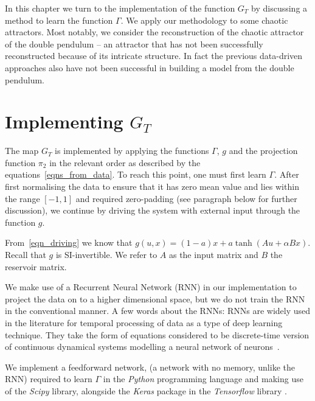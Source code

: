 In this chapter we turn to the implementation of the function $G_T$ by discussing a method to learn the function $\Gamma$. We apply our methodology to some chaotic attractors. Most notably, we consider the reconstruction of the chaotic attractor of the double pendulum -- an  attractor that has not been successfully reconstructed because of its intricate structure. In fact the previous data-driven approaches also have not been successful in building a model from the double pendulum. 




\section{Implementing $G_T$}
The map $G_T$ is implemented by applying the functions $\Gamma$, $g$ and the projection function $\pi_2$ in the relevant order as described by the equations~\ref{eqns_from_data}. To reach this point, one must first learn $\Gamma$.
After first normalising the data to ensure that it has zero mean value and lies within the range $[-1,1]$ and required zero-padding (see paragraph below for further discussion), we continue by driving the system with external input through the function $g$.

From~\eqref{eqn_driving} we know that $g(u,x) = (1-a) x + a \tanh(Au + \alpha B x)$. Recall that $g$ is SI-invertible. We refer to $A$ as the input matrix and $B$ the reservoir matrix. 

We make use of a Recurrent Neural Network (RNN) in our implementation to project the data on to a higher dimensional space, but we do not train the RNN in the conventional manner.  A few words about the RNNs: RNNs are widely used in the literature for temporal processing of data as a type of deep learning technique. They take the form of equations considered to be discrete-time version of continuous dynamical systems modelling a neural network of neurons~\cite{jaeger2001echo}.

We implement a feedforward network, (a network with no memory, unlike the RNN) required to learn $\Gamma$ in the \emph{Python} programming language and making use of the \emph{Scipy} library, alongside the \emph{Keras} package in the \emph{Tensorflow} library .

